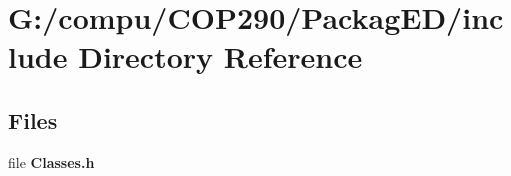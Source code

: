 \section{G\+:/compu/\+C\+O\+P290/\+Packag\+E\+D/include Directory Reference}
\label{dir_3ae62208ba03e147a81e8945f823573d}
\subsection*{Files}
\begin{DoxyCompactItemize}
\item 
file \textbf{ Classes.\+h}
\end{DoxyCompactItemize}
